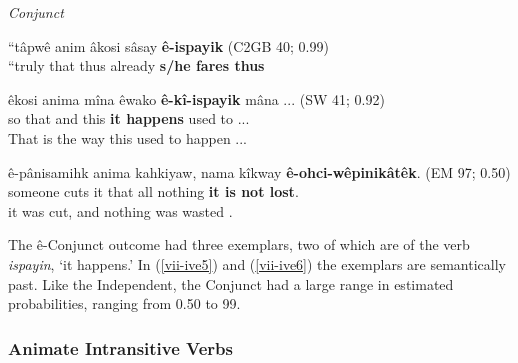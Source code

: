     
    
    \vspace{5mm}
    
    
\textit{Conjunct}

    \begin{exe}
    \ex
    \gll ``tâpwê anim âkosi sâsay \textbf{ê-ispayik} \tiny{(C2GB 40; 0.99)}\\
    ``truly that thus already \textbf{{s/he fares thus}}\\
    \label{vii-ive4}
    \end{exe}
    
    \begin{exe}
    \ex 
    \gll êkosi anima mîna êwako \textbf{ê-kî-ispayik} mâna ... \tiny{(SW 41; 0.92)} \\
         so that and this {\textbf{it happens}} {used to} ... \\
    \trans That is the way this used to happen ... \tiny{\citep[37-38]{Whitecalf1993}} \\
    \label{vii-ive5}
    \end{exe}
    
    \begin{exe}
    \ex 
    \gll ê-pânisamihk anima kahkiyaw, {nama kîkway} \textbf{ê-ohci-wêpinikâtêk}. \tiny{(EM 97; 0.50)} \\
         {someone cuts it} that all {nothing} {\textbf{it is not lost}}. \\
    \trans it was cut, and nothing was wasted \tiny{\citep[120]{Minde1997kwayask}}. \\
    \label{vii-ive6}
    \end{exe}
    
    The ê-Conjunct outcome had three exemplars, two of which are of the verb \textit{ispayin}, `it happens.' In (\ref{vii-ive5}) and (\ref{vii-ive6}) the exemplars are semantically past. Like the Independent, the Conjunct had a large range in estimated probabilities, ranging from 0.50 to 99.
    

\subsubsection{Animate Intransitive Verbs}

